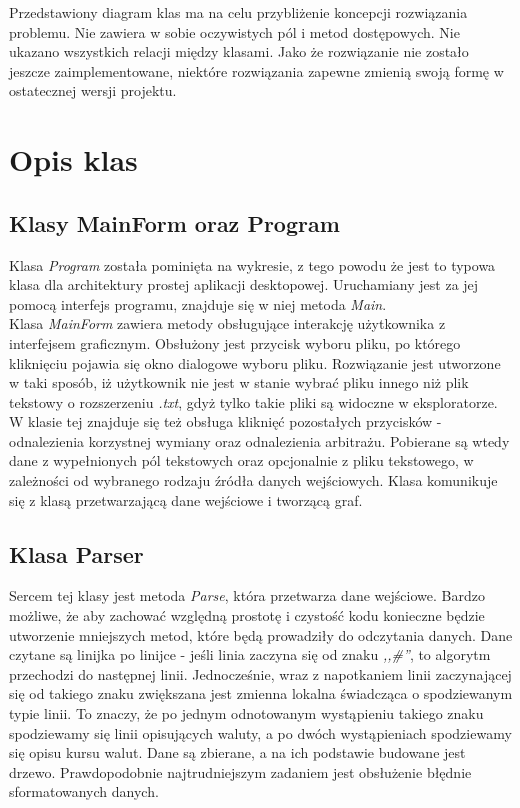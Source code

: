 \documentclass[a4paper,12pt]{article}
\newcommand\tab[1][0.6cm]{\hspace*{#1}}
\begin{document}
\tab Przedstawiony diagram klas ma na celu przybliżenie koncepcji rozwiązania problemu. Nie zawiera w sobie oczywistych pól i metod dostępowych. Nie ukazano wszystkich relacji między klasami. Jako że rozwiązanie nie zostało jeszcze zaimplementowane, niektóre rozwiązania zapewne zmienią swoją formę w ostatecznej wersji projektu.    

\section{Opis klas}
\subsection{Klasy MainForm oraz Program}
\tab Klasa \textit{Program} została pominięta na wykresie, z tego powodu że jest to typowa klasa dla architektury prostej aplikacji desktopowej. Uruchamiany jest za jej pomocą interfejs programu,  znajduje się w niej metoda \textit{Main}. \\
Klasa \textit{MainForm} zawiera metody obsługujące interakcję użytkownika z interfejsem graficznym. Obsłużony jest przycisk wyboru pliku, po którego kliknięciu pojawia się okno dialogowe wyboru pliku. Rozwiązanie jest utworzone w taki sposób, iż użytkownik nie jest w stanie wybrać pliku innego niż plik tekstowy o rozszerzeniu \textit{.txt}, gdyż tylko takie pliki są widoczne w eksploratorze. W klasie tej znajduje się też obsługa kliknięć pozostałych przycisków - odnalezienia korzystnej wymiany oraz odnalezienia arbitrażu. Pobierane są wtedy dane z wypełnionych pól tekstowych oraz opcjonalnie z pliku tekstowego, w zależności od wybranego rodzaju źródła danych wejściowych. Klasa komunikuje się z klasą przetwarzającą dane wejściowe i tworzącą graf. 

\subsection{Klasa Parser}
\tab Sercem tej klasy jest metoda \textit{Parse}, która przetwarza dane wejściowe. Bardzo możliwe, że aby zachować względną prostotę i czystość kodu konieczne będzie utworzenie mniejszych metod, które będą prowadziły do odczytania danych. Dane czytane są linijka po linijce - jeśli linia zaczyna się od znaku \textit{,,\#''}, to algorytm przechodzi do następnej linii. Jednocześnie, wraz z napotkaniem linii zaczynającej się od takiego znaku zwiększana jest zmienna lokalna świadcząca o spodziewanym typie linii. To znaczy, że po jednym odnotowanym wystąpieniu takiego znaku spodziewamy się linii opisujących waluty, a po dwóch wystąpieniach spodziewamy się opisu kursu walut. Dane są zbierane, a na ich podstawie budowane jest drzewo. Prawdopodobnie najtrudniejszym zadaniem jest obsłużenie błędnie sformatowanych danych.
\end{document}
